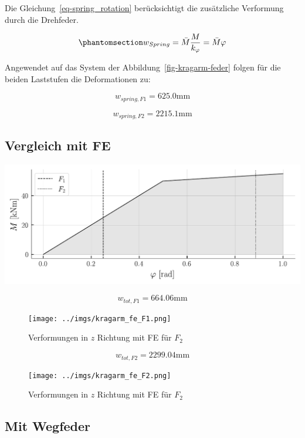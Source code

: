 \documentclass[
  12pt,
  letterpaper,
  egregdoesnotlikesansseriftitles]{scrreprt}
\begin{document}
Die Gleichung~\ref{eq-spring_rotation} berücksichtigt die zusätzliche
Verformung durch die Drehfeder.

\begin{equation}\phantomsection\label{eq-spring_rotation}{
w_{Spring} = \bar{M} \frac{M}{k_\varphi} = \bar{M} \varphi
}\end{equation}

Angewendet auf das System der Abbildung~\ref{fig-kragarm-feder} folgen
für die beiden Laststufen die Deformationen zu:

\begin{equation}w_{spring,F1} = 625.0 \text{mm}\end{equation}

\begin{equation}w_{spring,F2} = 2215.1 \text{mm}\end{equation}

\subsection{Vergleich mit FE}\label{vergleich-mit-fe}

\includegraphics{index_files/mediabag/04_Kragarm_files/figure-pdf/cell-14-output-1.pdf}

\begin{equation}w_{tot,F1} = 664.06 \text{mm}\end{equation}

\begin{figure}[H]

{\centering \texttt{[image: ../imgs/kragarm\_fe\_F1.png]}

}

\caption{Verformungen in \(z\) Richtung mit FE für \(F_2\)}

\end{figure}%

\begin{equation}w_{tot,F2} = 2299.04 \text{mm}\end{equation}

\begin{figure}[H]

{\centering \texttt{[image: ../imgs/kragarm\_fe\_F2.png]}

}

\caption{Verformungen in \(z\) Richtung mit FE für \(F_2\)}

\end{figure}%

\subsection{Mit Wegfeder}\label{mit-wegfeder}
\end{document}
